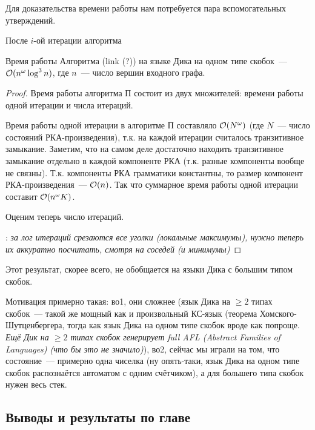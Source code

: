 Для доказательства времени работы нам потребуется пара вспомогательных утверждений.

\begin{lemma}
    После $i$-ой итерации алгоритма 
\end{lemma}

\begin{theorem}
Время работы Алгоритма (link (?)) на языке Дика на одном типе скобок~--- $\mathcal{O}(n^{\omega} \log^3 n)$, где $n$~--- число вершин входного графа.
\end{theorem}

\begin{proof}
Время работы алгоритма П состоит из двух множителей: времени работы одной итерации и числа итераций.

Время работы одной итерации в алгоритме П составляло $\mathcal{O}(N^{\omega})$ (где $N$~--- число состояний РКА-произведения), т.к. на каждой итерации считалось транзитивное замыкание. Заметим, что на самом деле достаточно находить транзитивное замыкание отдельно в каждой компоненте РКА (т.к. разные компоненты вообще не связны). Т.к. компоненты РКА грамматики константны, то размер компонент РКА-произведения~--- $\mathcal{O}(n)$. Так что суммарное время работы одной итерации составит $\mathcal{O}(n^{\omega} K)$.   

Оценим теперь число итераций. 

\TODO: \textit{за лог итераций срезаются все уголки (локальные максимумы), нужно теперь их аккуратно посчитать, смотря на соседей (и минимумы)}

\end{proof}

\begin{note}
Этот результат, скорее всего, не обобщается на языки Дика с большим типом скобок. 

Мотивация примерно такая: во1, они сложнее (язык Дика на $\ge 2$ типах скобок~--- такой же мощный как и произвольный КС-язык (теорема Хомского-Шутценбергера, тогда как язык Дика на одном типе скобок вроде как попроще. \textit{Ещё Дик на $\ge 2$ типах скобок генерирует full AFL (Abstract Families of Languages) (что бы это не значило)}), во2, сейчас мы играли на том, что состояние~--- примерно одна чиселка (ну опять-таки, язык Дика на одном типе скобок распознаётся автоматом с одним счётчиком), а для большего типа скобок нужен весь стек.
\end{note}

\subsection{Выводы и результаты по главе}